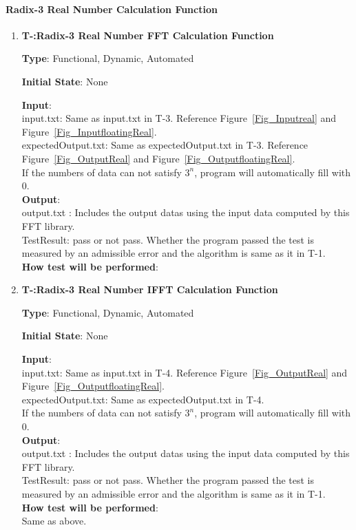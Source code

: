 \documentclass[12pt, titlepage]{article}
\newcounter{tnum}
\begin{document}
\paragraph{Radix-3 Real Number Calculation Function\\}

\begin{enumerate}

\item{\textbf{T-\thetnum \label{R3RFFT}:Radix-3 Real Number FFT Calculation Function}}

\textbf {Type}: Functional, Dynamic, Automated
					
\textbf {Initial State}: None
					
\textbf {Input}:\\
{\large input.txt}: Same as input.txt in T-3. Reference  Figure~\ref{Fig_Inputreal} and Figure~\ref{Fig_InputfloatingReal}. \\
{\large expectedOutput.txt}: Same as  expectedOutput.txt in T-3.  Reference  Figure~\ref{Fig_OutputReal} and Figure~\ref{Fig_OutputfloatingReal}.\\
If the numbers of data can not satisfy $3^n$, program will automatically fill with 0.\\
					
\textbf {Output}: \\{\large output.txt} : Includes the output datas using the input data computed by this FFT library.\\
{\large TestResult}: pass or not pass. Whether the program passed the test is measured by an admissible error and the algorithm is same as it in T-1.\\
					
\textbf {How test will be performed}: \\


\item{\textbf{T-\thetnum \label{R3RIFFT}:Radix-3 Real Number IFFT Calculation Function}}

\textbf {Type}: Functional, Dynamic, Automated
					
\textbf {Initial State}: None
					
\textbf {Input}:\\
{\large input.txt}: Same as input.txt in T-4. Reference   Figure~\ref{Fig_OutputReal} and Figure~\ref{Fig_OutputfloatingReal}.\\
{\large expectedOutput.txt}: Same as  expectedOutput.txt in T-4.\\
If the numbers of data can not satisfy $3^n$, program will automatically fill with 0.\\
					
\textbf {Output}: \\{\large output.txt} : Includes the output datas using the input data computed by this FFT library.\\
{\large TestResult}: pass or not pass. Whether the program passed the test is measured by an admissible error and the algorithm is same as it in T-1.\\

\textbf {How test will be performed}: \\
Same as above.


\end{enumerate}
\end{document}
